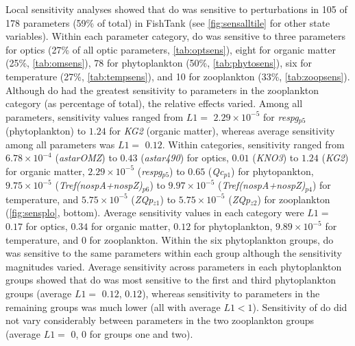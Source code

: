\documentclass[letterpaper,12pt,oneside]{article}\usepackage[]{graphicx}\usepackage[]{color}
\begin{document}
Local sensitivity analyses showed that \ac{do} was sensitive to perturbations in 105 of 178 parameters (59\% of total) in FishTank (see \cref{fig:sensalltile} for other state variables). Within each parameter category, \ac{do} was sensitive to three parameters for optics (27\% of all optic parameters, \cref{tab:optsens}), eight for organic matter (25\%, \cref{tab:omsens}), 78 for phytoplankton (50\%, \cref{tab:phytosens}), six for temperature (27\%, \cref{tab:tempsens}), and 10 for zooplankton (33\%, \cref{tab:zoopsens}). Although \ac{do} had the greatest sensitivity to parameters in the zooplankton category (as percentage of total), the relative effects varied. Among all parameters, sensitivity values ranged from $L1 = $ $2.29\times 10^{-5}$ for \textit{respg$_{p5}$} (phytoplankton) to $1.24$ for \textit{KG2} (organic matter), whereas average sensitivity among all parameters was $L1 = $ $0.12$.  Within categories, sensitivity ranged from $6.78\times 10^{-4}$ (\textit{astarOMZ}) to $0.43$ (\textit{astar490}) for optics, $0.01$ (\textit{KNO3}) to $1.24$ (\textit{KG2}) for organic matter, $2.29\times 10^{-5}$ (\textit{respg$_{p5}$}) to $0.65$ (\textit{Qc$_{p1}$}) for phytopankton, $9.75\times 10^{-5}$ (\textit{Tref(nospA+nospZ)$_{p6}$}) to $9.97\times 10^{-5}$ (\textit{Tref(nospA+nospZ)$_{p4}$}) for temperature, and $5.75\times 10^{-5}$ (\textit{ZQp$_{z1}$}) to $5.75\times 10^{-5}$ (\textit{ZQp$_{z2}$}) for zooplankton (\cref{fig:sensplo}, bottom).  Average sensitivity values in each category were $L1 = $ $0.17$ for optics, $0.34$ for organic matter, $0.12$ for phytoplankton, $9.89\times 10^{-5}$ for temperature, and $0$ for zooplankton.  Within the six phytoplankton groups, \ac{do} was sensitive to the same parameters within each group although the sensitivity magnitudes varied. Average sensitivity across parameters in each phytoplankton groups showed that \ac{do} was most sensitive to the first and third phytoplankton groups (average $L1 = $ $0.12$, $0.12$), whereas sensitivity to parameters in the remaining groups was much lower (all with average $L1 < 1$). Sensitivity of \ac{do} did not vary considerably between parameters in the two zooplankton groups (average $L1 = $ $0$, $0$ for groups one and two).
\end{document}
